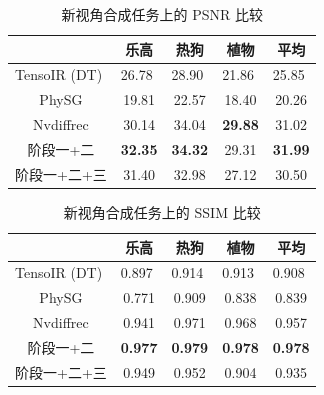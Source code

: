 \begin{table}[h]
  \centering
  \begin{tabular}{ccccc}
    \toprule
                                   & 乐高                        & 热狗                        & 植物                        & 平均                        \\
                                   \midrule
  \multicolumn{1}{l}{TensoIR (DT)} & \multicolumn{1}{l}{26.78} & \multicolumn{1}{l}{28.90} & \multicolumn{1}{l}{21.86} & \multicolumn{1}{l}{25.85} \\
  PhySG                            & 19.81                     & 22.57                     & 18.40                     & 20.26                     \\
  Nvdiffrec                        & 30.14                     & 34.04                     & \textbf{29.88}                     & 31.02                     \\
  \midrule
  阶段一+二                            & \textbf{32.35}                     & \textbf{34.32}                     & 29.31                     & \textbf{31.99}                     \\
  阶段一+二+三                          & 31.40                     & 32.98                     & 27.12                     & 30.50              \\
  \bottomrule
  \end{tabular}
  \caption{新视角合成任务上的 PSNR 比较}
  \label{tab:psnr}
\end{table}

\begin{table}[h]
  \centering
  \begin{tabular}{ccccc}
    \toprule
                                   & 乐高                        & 热狗                        & 植物                        & 平均                        \\
                                   \midrule
  \multicolumn{1}{l}{TensoIR (DT)} & \multicolumn{1}{l}{0.897} & \multicolumn{1}{l}{0.914} & \multicolumn{1}{l}{0.913} & \multicolumn{1}{l}{0.908} \\
  PhySG                            & 0.771                     & 0.909                     & 0.838                     & 0.839                     \\
  Nvdiffrec                        & 0.941                     & 0.971                     & 0.968                     & 0.957                     \\
  \midrule
  阶段一+二                            & \textbf{0.977}                     & \textbf{0.979}                     & \textbf{0.978}                     & \textbf{0.978}                     \\
  阶段一+二+三                          & 0.949                     & 0.952                     & 0.904                     & 0.935            \\

  \bottomrule
  \end{tabular}
  \caption{新视角合成任务上的 SSIM 比较}
  \label{tab:ssim}
\end{table}

